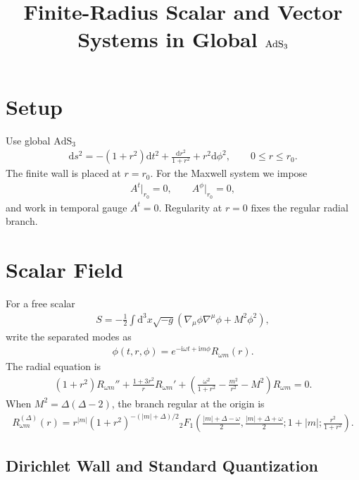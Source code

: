 \documentclass[11pt]{article}
\title{Finite-Radius Scalar and Vector Systems in Global \(\AdS_3\)}
\author{}
\date{}
\newcommand{\AdS}{\mathrm{AdS}}
\newcommand{\dd}{\mathrm{d}}
\newcommand{\ii}{\mathrm{i}}
\begin{document}
\maketitle

\section{Setup}

Use global \(\AdS_3\)
\begin{align}
\dd s^2=-(1+r^2)\dd t^2+\frac{\dd r^2}{1+r^2}+r^2\dd\phi^2,
\qquad 0\le r\le r_0 .
\end{align}
The finite wall is placed at \(r=r_0\).  For the Maxwell system we impose
\begin{align}
A^t\big|_{r_0}=0,\qquad A^\phi\big|_{r_0}=0 ,
\end{align}
and work in temporal gauge \(A^t=0\).  Regularity at \(r=0\) fixes the
regular radial branch.

\section{Scalar Field}

For a free scalar
\begin{align}
S=-\frac12\int\dd^3x\sqrt{-g}\left(\nabla_\mu\phi\nabla^\mu\phi
+M^2\phi^2\right),
\end{align}
write the separated modes as
\begin{align}
\phi(t,r,\phi)=e^{-\ii\omega t+\ii m\phi}R_{\omega m}(r).
\end{align}
The radial equation is
\begin{align}
(1+r^2)R_{\omega m}''+\frac{1+3r^2}{r}R_{\omega m}'
+\left(\frac{\omega^2}{1+r^2}-\frac{m^2}{r^2}-M^2\right)R_{\omega m}=0.
\end{align}
When \(M^2=\Delta(\Delta-2)\), the branch regular at the origin is
\begin{align}
R_{\omega m}^{(\Delta)}(r)=
r^{|m|}(1+r^2)^{-(|m|+\Delta)/2}
{}_2F_1\!\left(
\frac{|m|+\Delta-\omega}{2},
\frac{|m|+\Delta+\omega}{2};
1+|m|;
\frac{r^2}{1+r^2}
\right).
\end{align}

\subsection{Dirichlet Wall and Standard Quantization}
\end{document}
